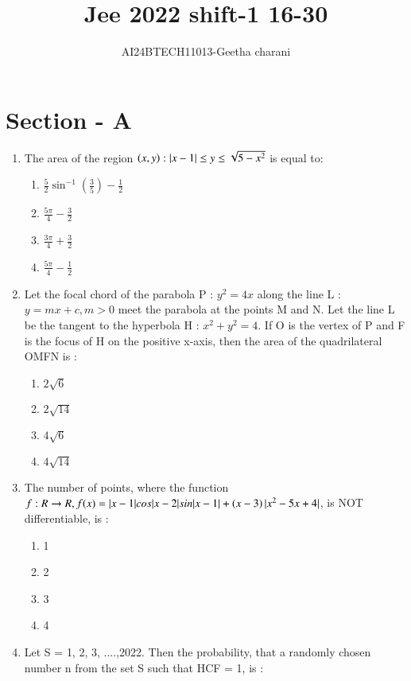 \documentclass[journal,12pt,onecolumn]{IEEEtran}
\theoremstyle{remark}
\begin{document}

\vspace{3cm}

\title{Jee 2022 shift-1 16-30}
\author{AI24BTECH11013-Geetha charani}
\maketitle
\bigskip

\renewcommand{\thefigure}{\theenumi}
\renewcommand{\thetable}{\theenumi}
\section{Section - A}
\begin{enumerate}
    \item The area of the region ${\left(x, y\right) : |x-1| \leq y \leq \sqrt{5-x^2}}$ is equal to:
\begin{enumerate}
    \item $\frac{5}{2}\sin^{-1}(\frac{3}{5})-\frac{1}{2}$
    \item $\frac{5\pi}{4}-\frac{3}{2}$
    \item $\frac{3\pi}{4}+\frac{3}{2}$
    \item $\frac{5\pi}{4}-\frac{1}{2}$
\end{enumerate}
\item Let the focal chord of the parabola P : $y^2 = 4x$ along the line L : $y = mx + c, m>0$ meet the parabola at the points M and N. Let the line L be the tangent to the hyperbola H : $x^2 + y^2 = 4$. If O is the vertex of P and F is the focus of H on the positive x-axis, then the area of the quadrilateral OMFN is :
\begin{enumerate}
    \item $2\sqrt{6}$
    \item $2\sqrt{14}$
    \item $4\sqrt{6}$
    \item $4\sqrt{14}$
\end{enumerate}
\item The number of points, where the function $f : R \rightarrow R, f(x) = |x - 1| cos|x-2| sin|x -1| + \left(x-3\right)|x^2 - 5x + 4|$, is NOT differentiable, is  :
\begin{enumerate}
    \item 1
    \item 2
    \item 3
    \item 4
\end{enumerate}
\item Let S = {1, 2, 3, ....,2022}. Then the probability, that a randomly chosen number n from the set S such that HCF = 1, is :

\end{enumerate}
\end{document}
